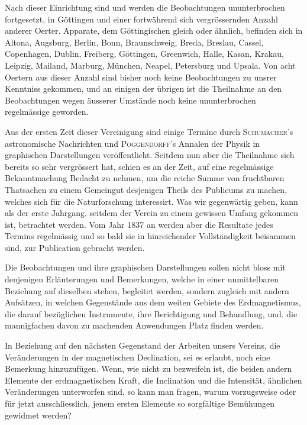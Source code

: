 Nach dieser Einrichtung sind und werden die Beobachtungen ununterbrochen fortgesetzt, in Göttingen und einer fortwährend sich vergrössernden Anzahl anderer Oerter. Apparate, dem Göttingischen gleich oder ähnlich, befinden sich in Altona, Augsburg, Berlin, Bonn, Braunschweig, Breda, Breslau, Cassel, Copenhagen, Dublin, Freiberg, Göttingen, Greenwich, Halle, Kasan, Krakau, Leipzig, Mailand, Marburg, München, Neapel, Petersburg und Upsala. Von acht Oertern aus dieser Anzahl sind bisher noch keine Beobachtungen zu unsrer Kenntniss gekommen, und an einigen der übrigen ist die Theilnahme an den Beobachtungen wegen äusserer Umstände noch keine ununterbrochen regelmässige geworden.

Aus der ersten Zeit dieser Vereinigung sind einige Termine durch \textsc{Schumacher}'s astronomische Nachrichten und \textsc{Poggendorff}'s Annalen der Physik in graphischen Darstellungen veröffentlicht. Seitdem nun aber die Theilnahme sich bereits so sehr vergrössert hat, schien es an der Zeit, auf eine regelmässige Bekanntmachung Bedacht zu nehmen, um die reiche Summe von fruchtbaren Thatsachen zu einem Gemeingut desjenigen Theils des Publicums zu machen, welches sich für die Naturforschung interessirt. Was wir gegenwärtig geben, kann als der erste Jahrgang. seitdem der Verein zu einem gewissen Umfang gekommen ist, betrachtet werden. Vom Jahr 1837 an werden aber die Resultate jedes Termins regelmässig und so bald sie in hinreichender Vollständigkeit beisammen sind, zur Publication gebracht werden.

Die Beobachtungen und ihre graphischen Darstellungen sollen nicht bloss mit denjenigen Erläuterungen und Bemerkungen, welche in einer unmittelbaren Beziehung auf dieselben stehen, begleitet werden, sondern zugleich mit andern Aufsätzen, in welchen Gegenstände aus dem weiten Gebiete des Erdmagnetismus, die darauf bezüglichen Instrumente, ihre Berichtigung und Behandlung, und. die mannigfachen davon zu machenden Anwendungen Platz finden werden.

In Beziehung auf den nächsten Gegenstand der Arbeiten unsers Vereins, die Veränderungen in der magnetischen Declination, sei es erlaubt, noch eine Bemerkung hinzuzufügen. Wenn, wie nicht zu bezweifeln ist, die beiden andern Elemente der erdmagnetischen Kraft, die Inclination und die Intensität, ähnlichen Veränderungen unterworfen sind, so kann man fragen, warum vorzugsweise oder für jetzt ausschliesslich, jenem ersten Elemente so sorgfältige Bemühungen gewidmet werden?

